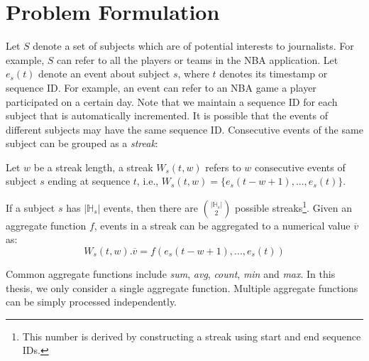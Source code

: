 \section{Problem Formulation}\label{sec:problem_definition}
Let $S$ denote a set of subjects which are of potential interests to journalists. 
For example, $S$ can refer to all the players or teams in the NBA application.
Let $e_s(t)$ denote an event about subject $s$, where $t$ denotes its timestamp or sequence ID. 
For example, an event can refer to an NBA game a player participated on a certain day. 
Note that we maintain a sequence ID for each subject that is automatically incremented. 
It is possible that the events of different subjects may have the same sequence ID. 
Consecutive events of the same subject can be grouped as a \textit{streak}:

\begin{definition}
Let $w$ be a streak length, a streak $W_s(t,w)$ refers to $w$ consecutive 
events of subject $s$ ending at sequence $t$, i.e., $W_s(t,w)=\{e_s(t-w+1),..., e_s(t)\}$.
\end{definition}

If a subject $s$ has $|\mathbb{H}_s|$ events, 
then there are $|\mathbb{H}_s|\choose{2}$ possible 
streaks\footnote{This number is derived by constructing a
streak using start and end sequence IDs.
}. 
Given an aggregate function $f$, events in a streak can be aggregated to a numerical value $\overline{v}$ as:
$$W_s(t,w).\overline{v} = f(e_s(t-w+1),..., e_s(t))$$


Common aggregate functions include \emph{sum}, \emph{avg}, \emph{count}, \emph{min} and \emph{max}. 
In this thesis, we only consider a single aggregate function. Multiple aggregate functions can be 
simply  processed independently.


